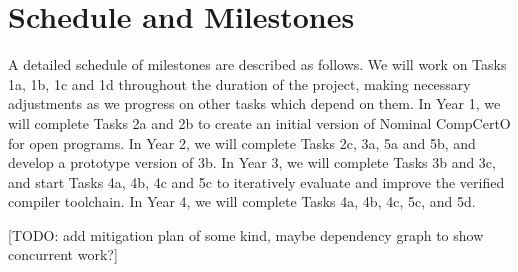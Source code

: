 \section{Schedule and Milestones}

A detailed schedule of milestones are described as follows.
We will work on Tasks 1a, 1b, 1c and 1d throughout the duration of the project,
making necessary adjustments as we progress on other tasks
which depend on them.
In Year 1, 
we will complete Tasks 2a and 2b to
create an initial version of Nominal CompCertO for open programs.
In Year 2, we will complete Tasks 2c, 3a, 5a and 5b, and
develop a prototype version of 3b.
In Year 3, 
we will complete Tasks 3b and 3c, and start Tasks 4a, 4b, 4c and 5c to
iteratively evaluate and improve the verified compiler toolchain.
In Year 4, we will complete Tasks 4a, 4b, 4c, 5c, and 5d.

[TODO: add mitigation plan of some kind,
maybe dependency graph to show concurrent work?]

